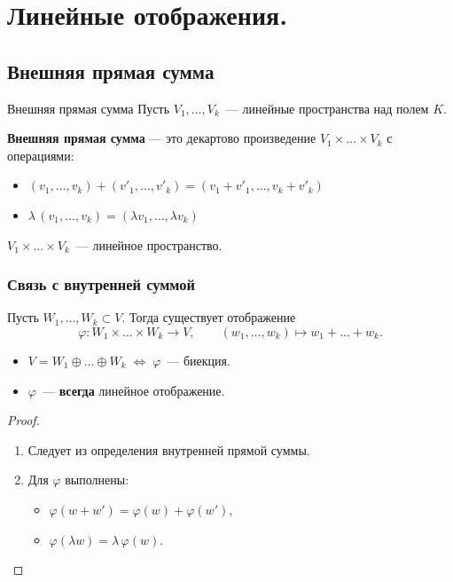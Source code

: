 
\section{Линейные отображения.}

\subsection{Внешняя прямая сумма}

\begin{Definition}{Внешняя прямая сумма}{}
	Пусть $V_1, \ldots, V_k$~--- линейные пространства над полем $K$.
	
	\textbf{Внешняя прямая сумма} --- это декартово произведение $V_1 \times \ldots \times V_k$
	с операциями:
	\begin{itemize}
		\item $(v_1, \ldots, v_k) + (v'_1, \ldots, v'_k) = (v_1 + v'_1, \ldots, v_k + v'_k)$
		\item $\lambda\,(v_1, \ldots, v_k) = (\lambda v_1, \ldots, \lambda v_k)$
	\end{itemize}
\end{Definition}

\begin{Statement}{}{}
	$V_1 \times \ldots \times V_k$~--- линейное пространство.
\end{Statement}

\subsubsection*{Связь с внутренней суммой}

Пусть $W_1, \ldots, W_k \subset V$. Тогда существует отображение
\[
\varphi \colon W_1 \times \ldots \times W_k \longrightarrow V,
\qquad
(w_1, \ldots, w_k) \longmapsto w_1 + \ldots + w_k.
\]

\begin{Proposition}{}{}
	\begin{itemize}
		\item $V = W_1 \oplus \ldots \oplus W_k \;\Longleftrightarrow\; \varphi$~--- биекция.
		\item $\varphi$~--- \textbf{всегда} линейное отображение.
	\end{itemize}
\end{Proposition}

\begin{proof}
	\begin{enumerate}
		\item Следует из определения внутренней прямой суммы.
		\item Для $\varphi$ выполнены:
		\begin{itemize}
			\item $\varphi(w + w') = \varphi(w) + \varphi(w')$,
			\item $\varphi(\lambda w) = \lambda\,\varphi(w)$.
		\end{itemize}
	\end{enumerate}
\end{proof}

